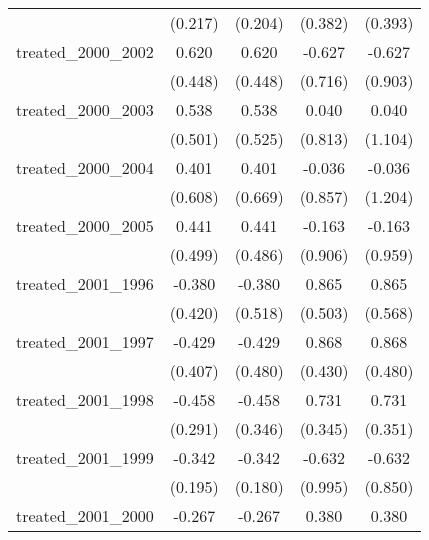 {\begin{tabular}{l*{4}{c}}
            &     (0.217)         &     (0.204)         &     (0.382)         &     (0.393)         \\
[1em]
treated\_2000\_2002&       0.620         &       0.620         &      -0.627         &      -0.627         \\
            &     (0.448)         &     (0.448)         &     (0.716)         &     (0.903)         \\
[1em]
treated\_2000\_2003&       0.538         &       0.538         &       0.040         &       0.040         \\
            &     (0.501)         &     (0.525)         &     (0.813)         &     (1.104)         \\
[1em]
treated\_2000\_2004&       0.401         &       0.401         &      -0.036         &      -0.036         \\
            &     (0.608)         &     (0.669)         &     (0.857)         &     (1.204)         \\
[1em]
treated\_2000\_2005&       0.441         &       0.441         &      -0.163         &      -0.163         \\
            &     (0.499)         &     (0.486)         &     (0.906)         &     (0.959)         \\
[1em]
treated\_2001\_1996&      -0.380         &      -0.380         &       0.865         &       0.865         \\
            &     (0.420)         &     (0.518)         &     (0.503)         &     (0.568)         \\
[1em]
treated\_2001\_1997&      -0.429         &      -0.429         &       0.868\sym{*}  &       0.868         \\
            &     (0.407)         &     (0.480)         &     (0.430)         &     (0.480)         \\
[1em]
treated\_2001\_1998&      -0.458         &      -0.458         &       0.731\sym{*}  &       0.731\sym{*}  \\
            &     (0.291)         &     (0.346)         &     (0.345)         &     (0.351)         \\
[1em]
treated\_2001\_1999&      -0.342         &      -0.342         &      -0.632         &      -0.632         \\
            &     (0.195)         &     (0.180)         &     (0.995)         &     (0.850)         \\
[1em]
treated\_2001\_2000&      -0.267         &      -0.267\sym{*}  &       0.380\sym{*}  &       0.380\sym{*}  \\

\end{tabular}}
